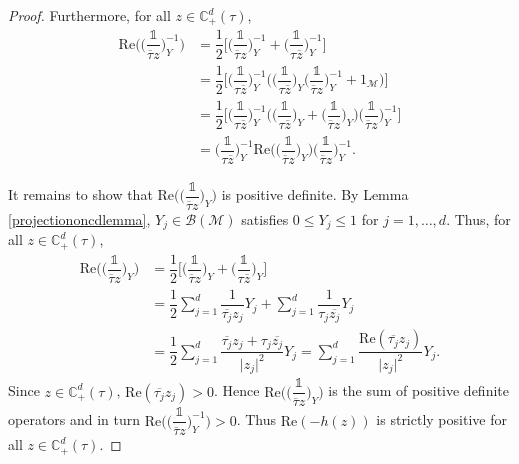 \documentclass[11pt, reqno]{amsart}
\newcommand\1{\boldsymbol {1}}
\numberwithin{equation}{section}
\begin{document}
\begin{proof}
Furthermore, for all $ z\in\mathbb{C}^{d}_{+}(\tau)$,
\begin{align*}
    \mathrm{Re}\bigg(\bigg(\dfrac{\mathds{1}}{\overline{\tau} z}\bigg)_{Y}^{-1}\bigg) &= \dfrac{1}{2}\bigg[\bigg(\dfrac{\mathds{1}}{\overline{\tau} z}\bigg)_{Y}^{-1}+\bigg(\dfrac{\mathds{1}}{\tau \overline{z}}\bigg)_{Y}^{-1}\bigg]\\
    &= \dfrac{1}{2}\bigg[\bigg(\dfrac{\mathds{1}}{\tau \overline{z}}\bigg)_{Y}^{-1}\bigg(\bigg(\dfrac{\mathds{1}}{\tau \overline{z}}\bigg)_{Y}\bigg(\dfrac{\mathds{1}}{\overline{\tau} z}\bigg)_{Y}^{-1}+1_{\mathcal{M}}\bigg)\bigg]\\
    &= \dfrac{1}{2}\bigg[\bigg(\dfrac{\mathds{1}}{\tau \overline{z}}\bigg)_{Y}^{-1}\bigg(\bigg(\dfrac{\mathds{1}}{\tau \overline{z}}\bigg)_{Y}+\bigg(\dfrac{\mathds{1}}{\overline{\tau} z}\bigg)_{Y}\bigg)\bigg(\dfrac{\mathds{1}}{\overline{\tau} z}\bigg)_{Y}^{-1}\bigg]\\
    &= \bigg(\dfrac{\mathds{1}}{\tau \overline{z}}\bigg)_{Y}^{-1}\mathrm{Re}\bigg(\bigg(\dfrac{\mathds{1}}{\overline{\tau} z}\bigg)_{Y}\bigg)\bigg(\dfrac{\mathds{1}}{\overline{\tau} z}\bigg)_{Y}^{-1}.
\end{align*}

It remains to show that $\mathrm{Re}\bigg(\bigg(\dfrac{\mathds{1}}{\overline{\tau} z}\bigg)_{Y}\bigg)$ is positive definite. By Lemma \ref{projectiononcdlemma}, $Y_{j}\in\mathcal{B}(\mathcal{M})$ satisfies $0\leq Y_{j}\leq 1$ for $j=1,\hdots,d$. Thus, for all $z\in\mathbb{C}^{d}_{+}(\tau)$, 
\begin{align*}
    \mathrm{Re}\bigg(\bigg(\dfrac{\mathds{1}}{\overline{\tau}z}\bigg)_{Y}\bigg) &= \dfrac{1}{2}\bigg[\bigg(\dfrac{\mathds{1}}{\overline{\tau}z}\bigg)_{Y} + \bigg(\dfrac{\mathds{1}}{\tau \overline{z}}\bigg)_{Y}\Big]\\
    &= \dfrac{1}{2}\sum_{j=1}^{d}\dfrac{1}{\overline{\tau_{j}}z_{j}}Y_{j}+\sum_{j=1}^{d}\dfrac{1}{\tau_{j}\overline{z_{j}}}Y_{j} \\
    &= \dfrac{1}{2}\sum_{j=1}^{d}\dfrac{\overline{\tau_{j}}z_{j}+\tau_{j}\overline{z_{j}}}{\lvert z_{j}\rvert^{2}}Y_{j} 
    = \sum_{j=1}^{d}\dfrac{\mathrm{Re}(\overline{\tau_{j}}z_{j})}{\lvert z_{j}\rvert^{2}}Y_{j}.
\end{align*}
Since $ z\in\mathbb{C}^{d}_{+}(\tau)$, $\mathrm{Re}(\overline{\tau_{j}} z_{j})>0$. Hence $\mathrm{Re}\bigg(\bigg(\dfrac{\mathds{1}}{\overline{\tau} z}\bigg)_{Y}\bigg)$ is the sum of positive definite operators and in turn $\mathrm{Re}\bigg(\bigg(\dfrac{\mathds{1}}{\overline{\tau} z}\bigg)^{-1}_{Y}\bigg)> 0$. Thus $\mathrm{Re}(-h(z))$ is strictly positive for all $ z\in\mathbb{C}_{+}^{d}(\tau)$.\end{proof} 
\end{document}
